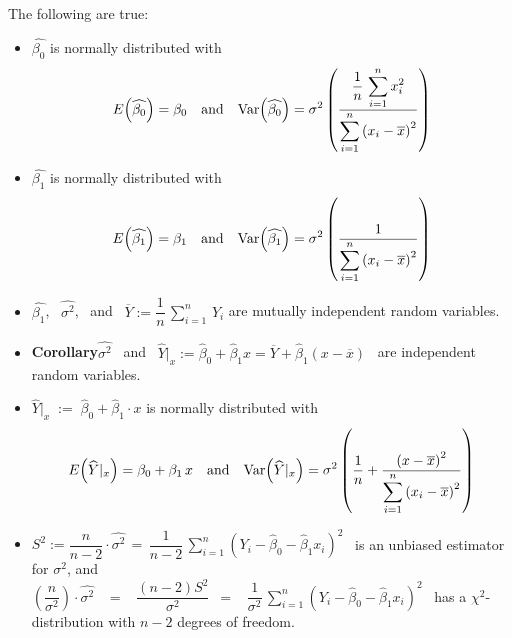 \documentclass{article}
\begin{document}
\begin{theorem} \quad The following are true:
\begin{itemize}
\item  $\widehat{\beta_{0}}$ is normally distributed with
          \begin{equation*}
          E\!\left(\widehat{\beta_{0}}\right) = \beta_{0}
          \quad\textnormal{and}\quad
          \textnormal{Var}\!\left(\widehat{\beta_{0}}\right) = 
          \sigma^{2}
          \left(\dfrac{\displaystyle{\dfrac{1}{n}\,\sum^{n}_{i=1}x_{i}^{2}}}{\displaystyle{\sum^{n}_{i=1}}\left(x_{i}-\overline{x}\right)^{2}}\right)
          \end{equation*}
\item  $\widehat{\beta_{1}}$ is normally distributed with
          \begin{equation*}
          E\!\left(\widehat{\beta_{1}}\right) = \beta_{1}
          \quad\textnormal{and}\quad
          \textnormal{Var}\!\left(\widehat{\beta_{1}}\right) = 
          \sigma^{2}
          \left(\dfrac{1}{\displaystyle{\sum^{n}_{i=1}}\left(x_{i}-\overline{x}\right)^{2}}\right)
          \end{equation*}
\item  $\widehat{\beta_{1}}$, \, $\widehat{\sigma^{2}}$, \, and \,
          $\overline{Y} := \dfrac{1}{n}\,\displaystyle{\sum^{n}_{i=1}}\,Y_{i}$
          are mutually independent random variables.
\item  \textbf{Corollary}\quad $\widehat{\sigma^{2}}$ \, and \, $\widehat{Y}|_{x} := \widehat{\beta}_{0} + \widehat{\beta}_{1}x = \overline{Y}+\widehat{\beta}_{1}(x-\overline{x})$ \, are independent random variables.
\item  $\widehat{Y}|_{x} \; := \; \widehat{\beta}_{0} + \widehat{\beta}_{1}\cdot x$ is normally distributed with
          \begin{equation*}
          E\!\left(\widehat{Y}|_{x}\right) = \beta_{0} + \beta_{1}\,x
          \quad\textnormal{and}\quad
          \textnormal{Var}\!\left(\widehat{Y}|_{x}\right) = 
          \sigma^{2}
          \left(\dfrac{1}{n} + \dfrac{\left(x-\overline{x}\right)^{2}}{\displaystyle{\sum^{n}_{i=1}}\left(x_{i}-\overline{x}\right)^{2}}\right)
          \end{equation*}
\item  $S^{2} := \dfrac{n}{n-2}\cdot\widehat{\sigma^{2}} \, = \, \dfrac{1}{n-2}\,\displaystyle{\sum^{n}_{i=1}}\left(Y_{i}-\widehat{\beta}_{0}-\widehat{\beta}_{1}x_{i}\right)^{2}$ \, is an unbiased estimator for $\sigma^{2}$, and \\
          $\left(\dfrac{n}{\sigma^{2}}\right)\cdot\widehat{\sigma^{2}}$ \, $=$ \,
          $\dfrac{(n-2)S^{2}}{\sigma^{2}}$ \,$=$ \,
          $\dfrac{1}{\sigma^{2}}\,\displaystyle{\sum^{n}_{i=1}}\left(Y_{i}-\widehat{\beta}_{0}-\widehat{\beta}_{1}x_{i}\right)^{2}$  
          \, has a $\chi^{2}$-distribution with $n-2$ degrees of freedom.
\end{itemize}
\end{theorem}
\end{document}
